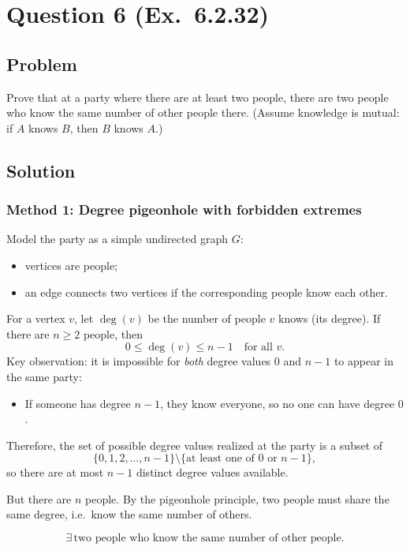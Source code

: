 \documentclass[12pt]{article}
\begin{document}
\newpage

\section{Question 6 (Ex.\ 6.2.32)}
\subsection{Problem}
Prove that at a party where there are at least two people, there are two people who know the same number of other people there. (Assume knowledge is mutual: if $A$ knows $B$, then $B$ knows $A$.)

\subsection{Solution}

\subsubsection{Method 1: Degree pigeonhole with forbidden extremes}
Model the party as a simple undirected graph $G$:
\begin{itemize}[leftmargin=*]
\item vertices are people;
\item an edge connects two vertices if the corresponding people know each other.
\end{itemize}
For a vertex $v$, let $\deg(v)$ be the number of people $v$ knows (its degree). If there are $n\ge 2$ people, then
\[
0 \le \deg(v) \le n-1\quad\text{for all }v.
\]
Key observation: it is impossible for \emph{both} degree values $0$ and $n-1$ to appear in the same party:
\begin{itemize}[leftmargin=*]
\item If someone has degree $n-1$, they know everyone, so no one can have degree $0$.
\end{itemize}
Therefore, the set of possible degree values realized at the party is a subset of
\[
\{0,1,2,\dots,n-1\}\setminus\{\text{at least one of }0\text{ or }n-1\},
\]
so there are at most $n-1$ distinct degree values available.

But there are $n$ people. By the pigeonhole principle, two people must share the same degree, i.e.\ know the same number of others.

\[
\boxed{\exists\,\text{two people who know the same number of other people.}}
\]
\end{document}
